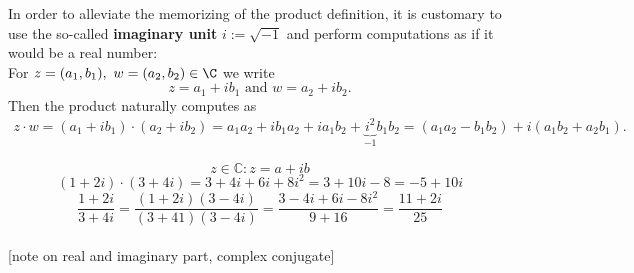 \begin{frame}
In order to alleviate the memorizing of the product definition, it is customary to use the so-called \textbf{\color{defgruen} imaginary unit} $i:=\sqrt{-1}$ and perform computations as if it would be a real number: \\
\vspace{0.3cm}
{\color{defgruen}For $z = (a_1, b_1),~w=(a_2, b_2) \in \C$ we write $$z = a_1 +ib_1\text{ and }w = a_2 +ib_2.$$}
Then the product naturally computes as
\begin{align*}
z\cdot w = (a_1 +ib_1)\cdot(a_2+ib_2)
=a_1a_2+ib_1a_2+ia_1b_2+\underbrace{i^2}_{-1}b_1b_2 
={(a_1a_2-b_1b_2)} + i{(a_1b_2+a_2b_1)}.
\end{align*}
\begin{ex}
	\blank
	\begin{equation*}
	z \in \mathbb{C} : z = a + ib
	\end{equation*}
	\begin{equation*}
	(1+2i)\cdot(3+4i) =3+4i+6i+8i^2 = 3+10i-8=-5+10i
	\end{equation*}
	\begin{equation*}
	\frac{1+2i}{3+4i} = \frac{(1+2i)(3-4i)}{(3+41)(3-4i)} = \frac{3-4i+6i-8i^2}{9+16} = \frac{11+2i}{25}
	\end{equation*}
	~\\
	{\small\color{header}[note on real and imaginary part, complex conjugate]}
\end{ex}
\end{frame}



